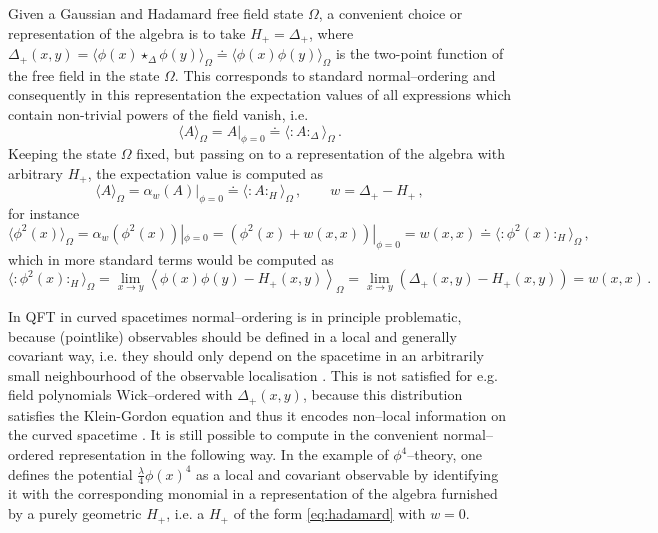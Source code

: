 \documentclass[10pt]{book}
\newcommand{\wick}[1]{:\!{#1}\!:}
\theoremstyle{break}
\begin{document}
Given a Gaussian and Hadamard free field state $\Omega$, a convenient choice or representation of the algebra is to take $H_+=\Delta_+$, where $\Delta_+(x,y)=\langle \phi(x)\star_\Delta\phi(y)\rangle_\Omega\doteq\langle \phi(x)\phi(y)\rangle_\Omega$ is the two-point function of the free field in the state $\Omega$. This corresponds to standard normal--ordering and consequently in this  representation the expectation values of all expressions which contain non-trivial powers of the field vanish, i.e.
\begin{equation}\label{eq_expval} \langle A\rangle_\Omega = A|_{\phi=0}\doteq \langle \wick{A}_\Delta\rangle_\Omega\,.\end{equation}
Keeping the state $\Omega$ fixed, but passing on to a representation of the algebra with arbitrary $H_+$, the expectation value is computed as
$$ \langle A\rangle_\Omega = \alpha_w(A)|_{\phi=0}\doteq \langle \wick{A}_H\rangle_\Omega\,, \qquad w=\Delta_+-H_+\,,$$
for instance
$$\langle \phi^2(x)\rangle_\Omega = \alpha_w(\phi^2(x))|_{\phi=0}=\left(\phi^2(x)+w(x,x)\right)|_{\phi=0}=w(x,x)\doteq \langle \wick{\phi^2(x)}_H\rangle_\Omega \,,$$
which in more standard terms would be computed as
$$\label{eq_expval2}\langle \wick{\phi^2(x)}_H\rangle_\Omega =\lim_{x\to y}\left\langle \phi(x)\phi(y)-H_+(x,y)\right\rangle_\Omega=\lim_{x\to y}\left(\Delta_+(x,y)-H_+(x,y)\right)=w(x,x)\,.$$

In QFT in curved spacetimes normal--ordering is in principle problematic, because (pointlike) observables should be defined in a local and generally covariant way, i.e. they should only depend on the spacetime in an arbitrarily small neighbourhood of the observable localisation \cite{Brunetti:2001dx, Hollands:2001nf}. This is not satisfied for e.g. field polynomials Wick--ordered with $\Delta_+(x,y)$, because this distribution satisfies the Klein-Gordon equation and thus it encodes non--local information on the curved spacetime \cite{Hollands:2001nf}. It is still possible to compute in the convenient normal--ordered representation in the following way. In the example of $\phi^4$--theory, one defines the potential $\frac{\lambda}{4} \phi(x)^4$ as a local and covariant observable by identifying it with the corresponding monomial in a representation of the algebra furnished by a purely geometric $H_+$, i.e. a $H_+$ of the form \eqref{eq:hadamard} with $w=0$.
\end{document}
